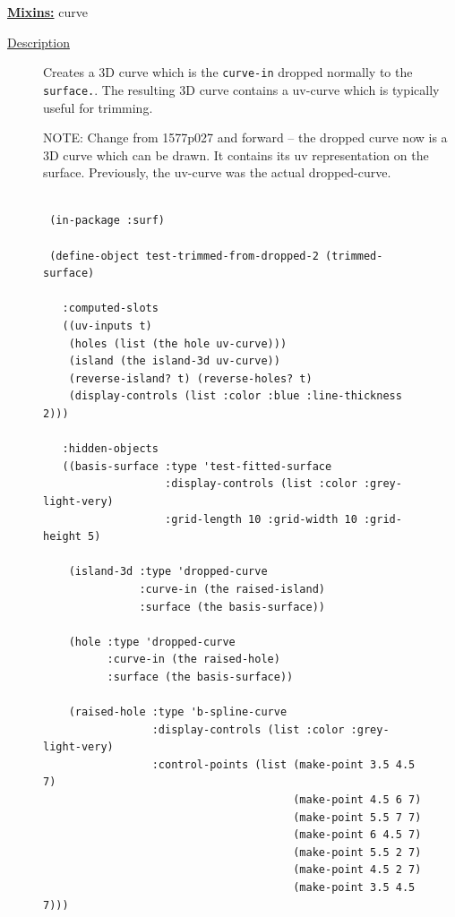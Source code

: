 \documentclass [11pt]{book}
\begin{document}
\begin{itemize}
\textbf{
\underline{Mixins:}} curve





\begin{description}

\item [
\underline{Description}]


Creates a 3D curve which is the \texttt{curve-in} dropped normally to the \texttt{surface.}.
The resulting 3D curve contains a uv-curve which is typically useful for trimming.


NOTE: Change from 1577p027 and forward -- the dropped curve now is a 3D curve which 
can be drawn. It contains its uv representation on the surface. Previously, the uv-curve
was the actual dropped-curve.






\end{description}




\begin{figure}
\begin{lrbox}{\boxedverb}
\begin{minipage}{\linewidth}
{\small

\begin{verbatim}
                  
 (in-package :surf)

 (define-object test-trimmed-from-dropped-2 (trimmed-surface)

   :computed-slots
   ((uv-inputs t)
    (holes (list (the hole uv-curve)))
    (island (the island-3d uv-curve))
    (reverse-island? t) (reverse-holes? t)
    (display-controls (list :color :blue :line-thickness 2)))
  
   :hidden-objects
   ((basis-surface :type 'test-fitted-surface
                   :display-controls (list :color :grey-light-very)
                   :grid-length 10 :grid-width 10 :grid-height 5)
   
    (island-3d :type 'dropped-curve
               :curve-in (the raised-island)
               :surface (the basis-surface))
   
    (hole :type 'dropped-curve
          :curve-in (the raised-hole)
          :surface (the basis-surface))
   
    (raised-hole :type 'b-spline-curve
                 :display-controls (list :color :grey-light-very)
                 :control-points (list (make-point 3.5 4.5 7) 
                                       (make-point 4.5 6 7) 
                                       (make-point 5.5 7 7) 
                                       (make-point 6 4.5 7) 
                                       (make-point 5.5 2 7) 
                                       (make-point 4.5 2 7) 
                                       (make-point 3.5 4.5 7)))
    

\end{verbatim}}
\end{minipage}
\end{lrbox}
\end{figure}
\end{itemize}
\end{document}
